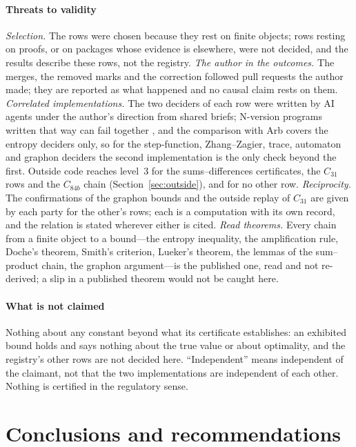 \documentclass[preprint,11pt,authoryear,a4paper]{elsarticle}
\begin{document}
\paragraph{Threats to validity} \emph{Selection.} The rows were chosen because they rest on finite objects; rows resting on proofs, or on packages whose evidence is elsewhere, were not decided, and the results describe these rows, not the registry. \emph{The author in the outcomes.} The merges, the removed marks and the correction followed pull requests the author made; they are reported as what happened and no causal claim rests on them. \emph{Correlated implementations.} The two deciders of each row were written by AI agents under the author's direction from shared briefs; N-version programs written that way can fail together \citep{KnightLeveson86}, and the comparison with Arb covers the entropy deciders only, so for the step-function, Zhang--Zagier, trace, automaton and graphon deciders the second implementation is the only check beyond the first. Outside code reaches level~3 for the sums--differences certificates, the $C_{31}$ rows and the $C_{84b}$ chain (Section~\ref{sec:outside}), and for no other row. \emph{Reciprocity.} The confirmations of the graphon bounds and the outside replay of $C_{31}$ are given by each party for the other's rows; each is a computation with its own record, and the relation is stated wherever either is cited. \emph{Read theorems.} Every chain from a finite object to a bound---the entropy inequality, the amplification rule, Doche's theorem, Smith's criterion, Lueker's theorem, the lemmas of the sum--product chain, the graphon argument---is the published one, read and not re-derived; a slip in a published theorem would not be caught here.

\paragraph{What is not claimed} Nothing about any constant beyond what its certificate establishes: an exhibited bound holds and says nothing about the true value or about optimality, and the registry's other rows are not decided here. ``Independent'' means independent of the claimant, not that the two implementations are independent of each other. Nothing is certified in the regulatory sense.

\section{Conclusions and recommendations}\label{sec:conclusions}
\end{document}
